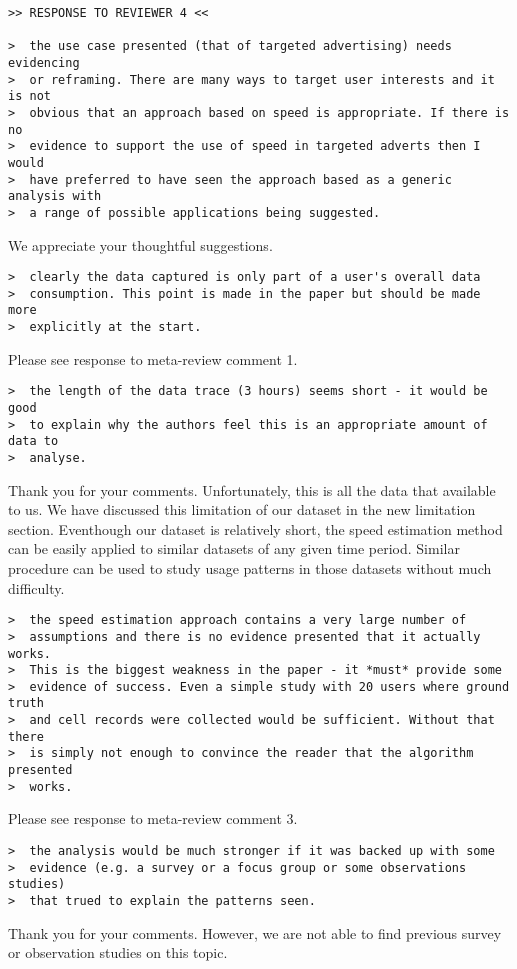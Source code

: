 \newpage
\begin{verbatim}
>> RESPONSE TO REVIEWER 4 <<

>  the use case presented (that of targeted advertising) needs evidencing
>  or reframing. There are many ways to target user interests and it is not
>  obvious that an approach based on speed is appropriate. If there is no
>  evidence to support the use of speed in targeted adverts then I would
>  have preferred to have seen the approach based as a generic analysis with
>  a range of possible applications being suggested.
\end{verbatim}

We appreciate your thoughtful suggestions. 


\begin{verbatim}
>  clearly the data captured is only part of a user's overall data
>  consumption. This point is made in the paper but should be made more
>  explicitly at the start.
\end{verbatim}

Please see response to meta-review comment 1.

\begin{verbatim}
>  the length of the data trace (3 hours) seems short - it would be good
>  to explain why the authors feel this is an appropriate amount of data to
>  analyse.
\end{verbatim}

Thank you for your comments. Unfortunately, this is all the data that available to us. We have discussed this limitation of our dataset in the new limitation section. Eventhough our dataset is relatively short, the speed estimation method can be easily applied to similar datasets of any given time period. Similar procedure can be used to study usage patterns in those datasets without much difficulty.


\begin{verbatim}
>  the speed estimation approach contains a very large number of
>  assumptions and there is no evidence presented that it actually works.
>  This is the biggest weakness in the paper - it *must* provide some
>  evidence of success. Even a simple study with 20 users where ground truth
>  and cell records were collected would be sufficient. Without that there
>  is simply not enough to convince the reader that the algorithm presented
>  works.
\end{verbatim}

Please see response to meta-review comment 3.

\begin{verbatim}
>  the analysis would be much stronger if it was backed up with some
>  evidence (e.g. a survey or a focus group or some observations studies)
>  that trued to explain the patterns seen.
\end{verbatim}

Thank you for your comments.
However, we are not able to find previous survey or observation studies on this topic.

